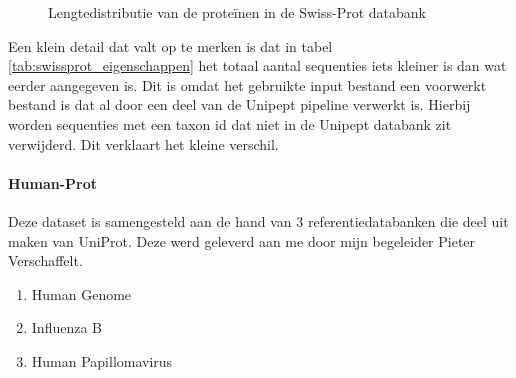 \documentclass[11pt,dutch,faculty=we,layout=titlefont,underline=false,titleUppercase=true,titleUnderline=true]{ugent2016-report}
\begin{document}
    \begin{figure}[H]
        \centering
        \caption{Lengtedistributie van de proteïnen in de Swiss-Prot databank}\label{fig:swissprot_length}
    \end{figure}

    Een klein detail dat valt op te merken is dat in tabel \ref{tab:swissprot_eigenschappen} het totaal aantal sequenties iets kleiner is dan wat eerder aangegeven is.
    Dit is omdat het gebruikte input bestand een voorwerkt bestand is dat al door een deel van de Unipept pipeline verwerkt is.
    Hierbij worden sequenties met een taxon id dat niet in de Unipept databank zit verwijderd.
    Dit verklaart het kleine verschil.

    \paragraph{Human-Prot} Deze dataset is samengesteld aan de hand van 3 referentiedatabanken die deel uit maken van UniProt.
    Deze werd geleverd aan me door mijn begeleider Pieter Verschaffelt.
    \begin{enumerate}
        \item Human Genome~\cite{proteomes_homo_sapiens}
        \item Influenza B~\cite{proteomes_infuenza_b}
        \item Human Papillomavirus~\cite{proteomes_human_papillomavirus}
    \end{enumerate}
\end{document}
